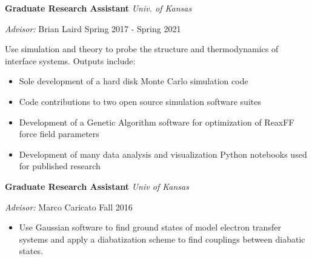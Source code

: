 {\bf Graduate Research Assistant} \hfill \textit{Univ. of Kansas}

\textit{Advisor: } Brian Laird \hfill Spring 2017 - Spring 2021

Use simulation and theory to probe the structure and thermodynamics of interface systems. Outputs include:
\begin{itemize}
  \raggedright
  \item Sole development of a hard disk Monte Carlo simulation code
  \item Code contributions to two open source simulation software suites
  \item Development of a Genetic Algorithm software for optimization of ReaxFF force field parameters
  \item Development of many data analysis and visualization Python notebooks used for published research
\end{itemize}

\vspace{\y}
{\bf Graduate Research Assistant} \hfill \textit{Univ of Kansas}

\textit{Advisor: } Marco Caricato \hfill Fall 2016

\begin{itemize}[rightmargin=\dimexpr\linewidth-10cm-\leftmargin\relax,noitemsep,topsep=0cm]
  \raggedright
  \item Use Gaussian software to find ground states of model electron transfer systems and apply a diabatization scheme to find couplings between diabatic states.
\end{itemize}
